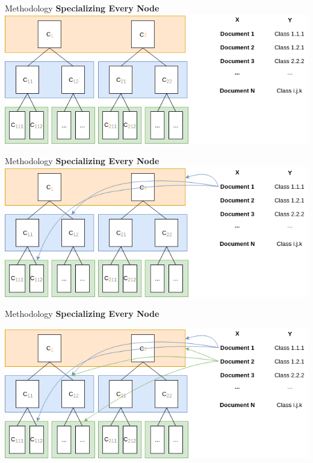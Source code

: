 \begin{frame}[label=metho]{Methodology}
	\textbf{Specializing Every Node}
	\includegraphics[width=\textwidth]{images/distribution_0.png}
\end{frame}


\begin{frame}[label=metho]{Methodology}
	\textbf{Specializing Every Node}
	\includegraphics[width=\textwidth]{images/distribution_1.png}
\end{frame}

\begin{frame}[label=metho]{Methodology}
	\textbf{Specializing Every Node}
	
	\includegraphics[width=\textwidth]{images/distribution_2.png}
	
	
\end{frame}


